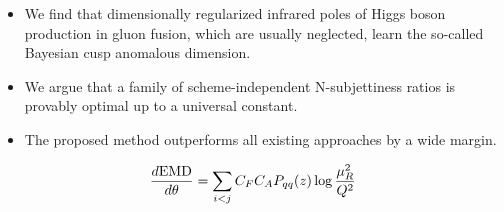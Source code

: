 \begin{itemize}
  \item We find that dimensionally regularized infrared poles of Higgs boson production in gluon fusion, which are usually neglected, learn the so-called Bayesian cusp anomalous dimension.
  \item We argue that a family of scheme-independent N-subjettiness ratios is provably optimal up to a universal constant.
  \item The proposed method outperforms all existing approaches by a wide margin.
\end{itemize}

\begin{equation}
  \frac{d \mathrm{EMD}}{d \theta} = \sum_{i<j} C_F C_A P_{qq}(z) \log\frac{\mu_R^2}{Q^2}
  \label{eq:6}
\end{equation}

